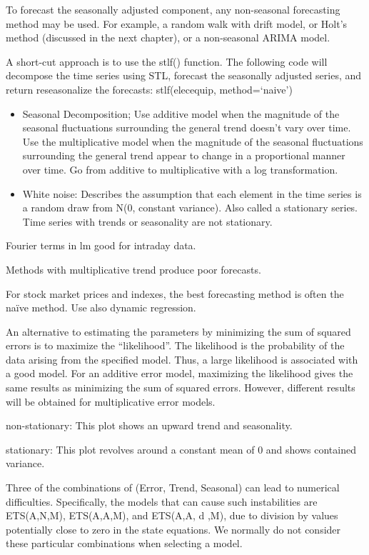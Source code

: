 \documentclass[]{book}
\begin{document}
To forecast the seasonally adjusted component, any non-seasonal forecasting method may be used. For example, a random walk with drift model, or Holt's method (discussed in the next chapter), or a non-seasonal ARIMA model.

A short-cut approach is to use the stlf() function. The following code will decompose the time series using STL, forecast the seasonally adjusted series, and return reseasonalize the forecasts: stlf(elecequip, method=`naive')

\begin{itemize}
\item
  Seasonal Decomposition; Use additive model when the magnitude of the seasonal fluctuations surrounding the general trend doesn't vary over time. Use the multiplicative model when the magnitude of the seasonal fluctuations surrounding the general trend appear to change in a proportional manner over time. Go from additive to multiplicative with a log transformation.
\item
  White noise: Describes the assumption that each element in the time series is a random draw from N(0, constant variance). Also called a stationary series. Time series with trends or seasonality are not stationary.
\end{itemize}

Fourier terms in lm good for intraday data.

Methods with multiplicative trend produce poor forecasts.

For stock market prices and indexes, the best forecasting method is often the naïve method. Use also dynamic regression.

An alternative to estimating the parameters by minimizing the sum of squared errors is to maximize the ``likelihood''. The likelihood is the probability of the data arising from the specified model. Thus, a large likelihood is associated with a good model. For an additive error model, maximizing the likelihood gives the same results as minimizing the sum of squared errors. However, different results will be obtained for multiplicative error models.

non-stationary: This plot shows an upward trend and seasonality.

stationary: This plot revolves around a constant mean of 0 and shows contained variance.

Three of the combinations of (Error, Trend, Seasonal) can lead to numerical difficulties. Specifically, the models that can cause such instabilities are ETS(A,N,M), ETS(A,A,M), and ETS(A,A, d ,M), due to division by values potentially close to zero in the state equations. We normally do not consider these particular combinations when selecting a model.
\end{document}
